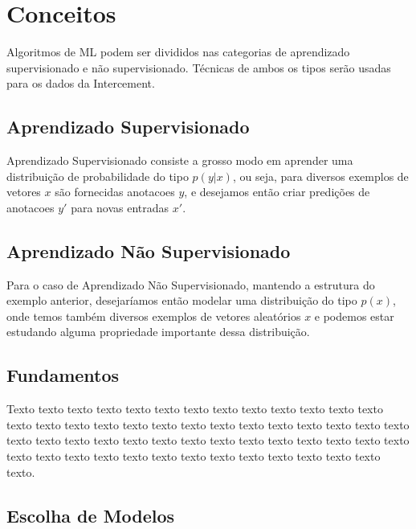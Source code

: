 \chapter{Conceitos}
\label{cap:conceitos}

Algoritmos de ML podem ser divididos nas categorias de aprendizado supervisionado e não supervisionado. Técnicas de ambos os tipos serão usadas para os dados da Intercement.

\section{Aprendizado Supervisionado}

Aprendizado Supervisionado consiste a grosso modo em aprender uma distribuição de probabilidade do tipo $p(y | x)$, ou seja, para diversos exemplos de vetores $x$ são fornecidas anotacoes $y$, e desejamos então criar predições de anotacoes $y'$ para novas entradas $x'$.

\section{Aprendizado Não Supervisionado}

Para o caso de Aprendizado Não Supervisionado, mantendo a estrutura do exemplo anterior, desejaríamos então modelar uma distribuição do tipo $p(x)$, onde temos também diversos exemplos de vetores aleatórios $x$ e podemos estar estudando alguma propriedade importante dessa distribuição.


\section{Fundamentos}
\label{sec:fundamentos}

Texto texto texto texto texto texto texto texto texto texto texto texto texto
texto texto texto texto texto texto texto texto texto texto texto texto texto
texto texto texto texto texto texto texto texto texto texto texto texto texto
texto texto texto texto texto texto texto texto texto texto texto texto texto
texto texto texto.

\section{Escolha de Modelos}

